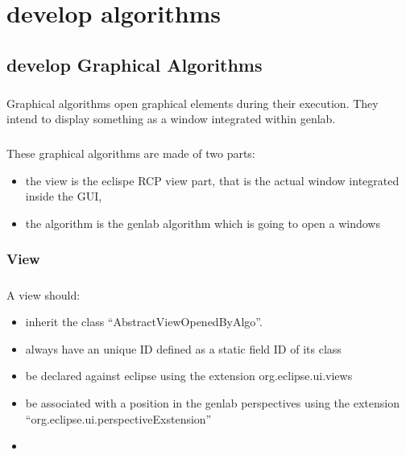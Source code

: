 \documentclass[a4paper,10pt]{book}
\begin{document}
\chapter{develop algorithms}

\section{develop Graphical Algorithms}

\paragraph*{}
Graphical algorithms open graphical elements during their execution. They intend to display something as a window integrated within genlab.

\paragraph*{}
These graphical algorithms are made of two parts:
\begin{itemize}
\item the view is the eclispe RCP view part, that is the actual window integrated inside the GUI,
\item the algorithm is the genlab algorithm which is going to open a windows
\end{itemize}

\subsection{View}

\paragraph*{}
A view should:
\begin{itemize}
 \item inherit the class ``AbstractViewOpenedByAlgo''.
\item always have an unique ID defined as a static field ID of its class
\item be declared against eclipse using the extension org.eclipse.ui.views
\item be associated with a position in the genlab perspectives using the extension ``org.eclipse.ui.perspectiveExstension''
\item 
\end{itemize}

 
 
\end{document}
